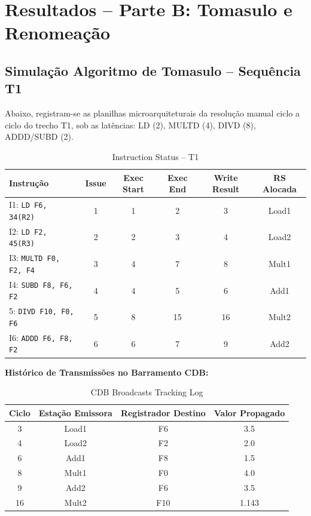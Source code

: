 \documentclass[12pt,a4paper]{article}
\begin{document}
\section{Resultados -- Parte B: Tomasulo e Renomeação}
\label{sec:resultadosB}

\subsection{Simulação Algoritmo de Tomasulo -- Sequência T1}
Abaixo, registram-se as planilhas microarquiteturais da resolução manual ciclo a ciclo do trecho T1, sob as latências: LD (2), MULTD (4), DIVD (8), ADDD/SUBD (2).

\begin{table}[H]
\centering
\caption{Instruction Status -- T1}
\label{tab:t1_status}
\begin{tabular}{@{}lccccc@{}}
\toprule
\textbf{Instrução} & \textbf{Issue} & \textbf{Exec Start} & \textbf{Exec End} & \textbf{Write Result} & \textbf{RS Alocada} \\ \midrule
I1: \texttt{LD F6, 34(R2)}    & 1 & 1 & 2 & 3  & Load1 \\
I2: \texttt{LD F2, 45(R3)}    & 2 & 2 & 3 & 4  & Load2 \\
I3: \texttt{MULTD F0, F2, F4} & 3 & 4 & 7 & 8  & Mult1 \\
I4: \texttt{SUBD F8, F6, F2}  & 4 & 4 & 5 & 6  & Add1  \\
5: \texttt{DIVD F10, F0, F6} & 5 & 8 & 15 & 16 & Mult2 \\
I6: \texttt{ADDD F6, F8, F2}  & 6 & 6 & 7 & 9  & Add2  \\ \bottomrule
\end{tabular}
\end{table}

\textbf{Histórico de Transmissões no Barramento CDB:}
\begin{table}[H]
\centering
\caption{CDB Broadcasts Tracking Log}
\begin{tabular}{@{}cccc@{}}
\toprule
\textbf{Ciclo} & \textbf{Estação Emissora} & \textbf{Registrador Destino} & \textbf{Valor Propagado} \\ \midrule
3  & Load1 & F6  & 3.5   \\
4  & Load2 & F2  & 2.0   \\
6  & Add1  & F8  & 1.5   \\
8  & Mult1 & F0  & 4.0   \\
9  & Add2  & F6  & 3.5   \\
16 & Mult2 & F10 & 1.143 \\ \bottomrule
\end{tabular}
\end{table}
\end{document}
